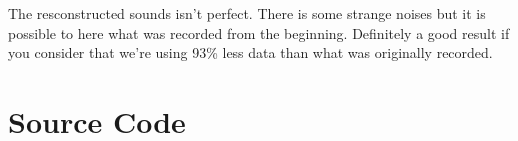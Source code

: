 \documentclass[12pt]{article}
\begin{document}
The resconstructed sounds isn't perfect.
There is some strange noises but it is possible to here what was recorded from the beginning.
Definitely a good result if you consider that we're using 93\% less data than what was originally recorded.




\clearpage
\section{Source Code}


\end{document}
